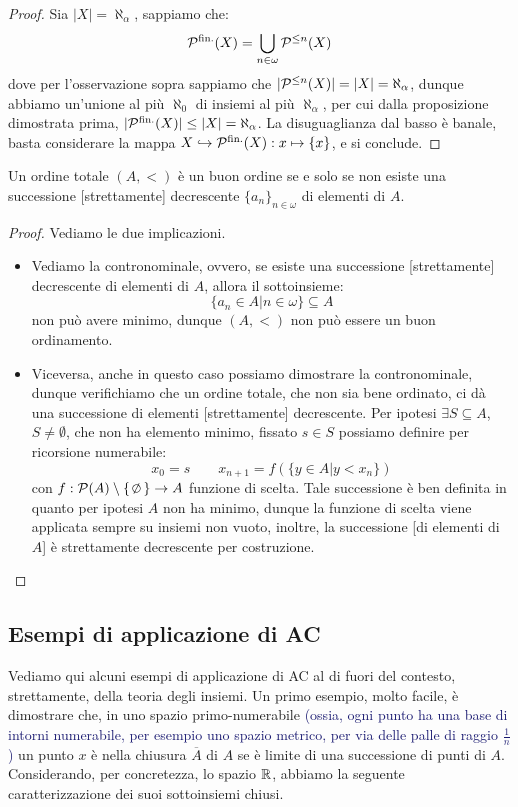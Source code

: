 \begin{proof}
	Sia $|X| = \aleph_\alpha$, sappiamo che:
	\[ \mathcal{P}^{\text{fin.}}(X) = \bigcup_{n \in \omega} \mathcal{P}^{\leq n}(X)
		\]
	dove per l'osservazione sopra sappiamo che $|\mathcal{P}^{\leq n}(X)| = |X| = \aleph_\alpha$, dunque abbiamo un'unione al pi\`u $\aleph_0$ di insiemi al pi\`u $\aleph_\alpha$, per cui dalla proposizione dimostrata prima,
	$|\mathcal{P}^{\text{fin.}}(X)| \leq |X| = \aleph_\alpha$. La disuguaglianza dal basso \`e banale, basta considerare la mappa $X \hookrightarrow \mathcal{P}^{\text{fin.}}(X) : x \mapsto \{x\}$, e si conclude.
\end{proof}

\begin{proposition}
	Un ordine totale $(A,<)$ \`e un buon ordine se e solo se non esiste una successione [strettamente] decrescente $\{a_n\}_{n \in \omega}$ di elementi di $A$.
\end{proposition}

\begin{proof}
	Vediamo le due implicazioni.
	\begin{itemize}
		\item[$\boxed{\Longrightarrow}$] Vediamo la contronominale, ovvero, se esiste una successione [strettamente] decrescente di elementi di $A$, allora il sottoinsieme:
		\[ \{a_n \in A | n \in \omega\} \subseteq A
			\]
		non pu\`o avere minimo, dunque $(A,<)$ non pu\`o essere un buon ordinamento.
		\item[$\boxed{\Longleftarrow}$] Viceversa, anche in questo caso possiamo dimostrare la contronominale, dunque verifichiamo che un ordine totale, che non sia bene ordinato, ci d\`a una successione di elementi [strettamente] decrescente.
		Per ipotesi $\exists S \subseteq A$, $S \ne \emptyset$, che non ha elemento minimo, fissato $s \in S$ possiamo definire per ricorsione numerabile:
		\[ x_0 = s \qquad x_{n+1} = f(\{y \in A | y < x_n\})
			\]
		con $f : \ps(A) \setminus \{\emptyset\} \to A$ funzione di scelta. Tale successione \`e ben definita in quanto per ipotesi $A$ non ha minimo, dunque la funzione di scelta viene applicata sempre su insiemi non vuoto, inoltre, la successione [di elementi di $A$] \`e strettamente decrescente per costruzione.
	\end{itemize}	
\end{proof}

\pagebreak

\subsection{Esempi di applicazione di AC}
Vediamo qui alcuni esempi di applicazione di AC al di fuori del contesto, strettamente, della teoria degli insiemi. Un primo esempio, molto facile, \`e dimostrare che, in uno spazio primo-numerabile \textcolor{MidnightBlue}{(ossia, ogni punto ha una base di intorni numerabile, per esempio uno spazio metrico, per via delle palle di raggio $\frac 1n$)} un punto $x$ \`e nella 
chiusura $\overline A$ di $A$ se \`e limite di una successione di punti di $A$. Considerando, per concretezza, lo spazio $\mathbb R$, abbiamo la seguente caratterizzazione dei suoi sottoinsiemi chiusi.

